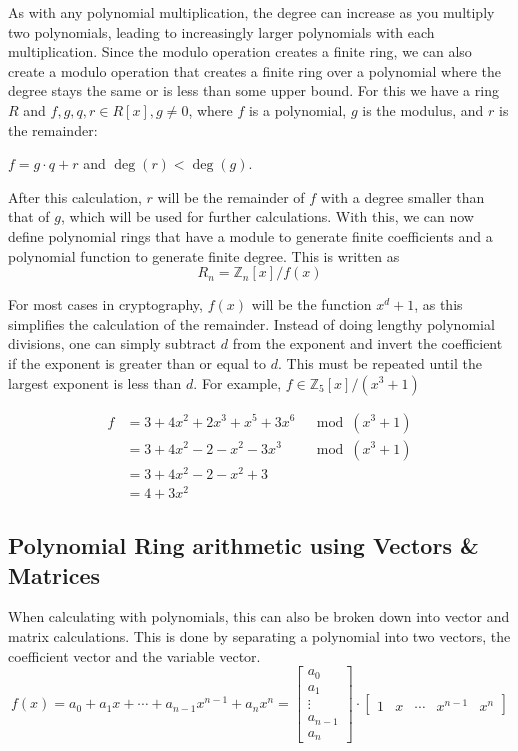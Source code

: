 As with any polynomial multiplication, the degree can increase as you multiply two polynomials, leading to increasingly larger polynomials with each multiplication. Since the modulo operation creates a finite ring, we can also create a modulo operation that creates a finite ring over a polynomial where the degree stays the same or is less than some upper bound. For this we have a ring $R$ and $f, g, q, r \in R[x], g\neq 0$, where $f$ is a polynomial, $g$ is the modulus, and $r$ is the remainder:
\begin{center}
  $f = g\cdot q + r $ and $\deg(r)<\deg(g)$.
\end{center}

After this calculation, $r$ will be the remainder of $f$ with a degree smaller than that of $g$, which will be used for further calculations. With this, we can now define polynomial rings that have a module to generate finite coefficients and a polynomial function to generate finite degree. This is written as 
$$R_n = \mathbb{Z}_n[x]/f(x)$$

For most cases in cryptography, $f(x)$ will be the function $x^d+1$, as this simplifies the calculation of the remainder. Instead of doing lengthy polynomial divisions, one can simply subtract $d$ from the exponent and invert the coefficient if the exponent is greater than or equal to $d$. This must be repeated until the largest exponent is less than $d$. For example, $f \in \mathbb{Z}_5[x]/(x^3+1)$

\begin{align*}
  f & = 3+4x^2+2x^3+x^5+3x^6 & \mod (x^3+1) \\
    & = 3+4x^2-2-x^2-3x^3    & \mod (x^3+1) \\
    & = 3+4x^2-2-x^2+3                      \\
    & = 4+3x^2
\end{align*}

\subsection*{Polynomial Ring arithmetic using Vectors \& Matrices}

When calculating with polynomials, this can also be broken down into vector and matrix calculations. This is done by separating a polynomial into two vectors, the coefficient vector and the variable vector.
$$
  f(x) = a_0+ a_1x+\cdots+ a_{n-1}x^{n-1}+a_nx^n =
  \begin{bmatrix}a_0\\a_1\\ \vdots \\a_{n-1}\\a_n \end{bmatrix}
  \cdot
  \begin{bmatrix}1 & x & \cdots & x^{n-1} &  x^n \end{bmatrix}
$$

